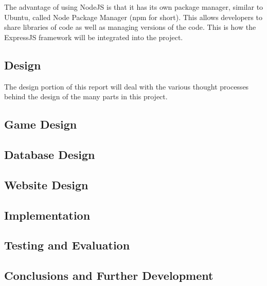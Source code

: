 \documentclass[12pt]{article}
\begin{document}
The advantage of using NodeJS is that it has its own package manager, similar to Ubuntu, called Node Package Manager (npm for short). This allows developers to share libraries of code as well as managing versions of the code. This is how the ExpressJS framework will be integrated into the project.

\newpage
\begin{center}
\section{Design}
\end{center}
The design portion of this report will deal with the various thought processes behind the design of the many parts in this project. 

\begin{center}
\subsection{Game Design}
\end{center}

\begin{center}
\subsection{Database Design}
\end{center}

\begin{center}
\subsection{Website Design}
\end{center}

\begin{center}
\section{Implementation}
\end{center}

\begin{center}
\section{Testing and Evaluation}
\end{center}

\begin{center}
\section{Conclusions and Further Development}
\end{center}
\end{document}
